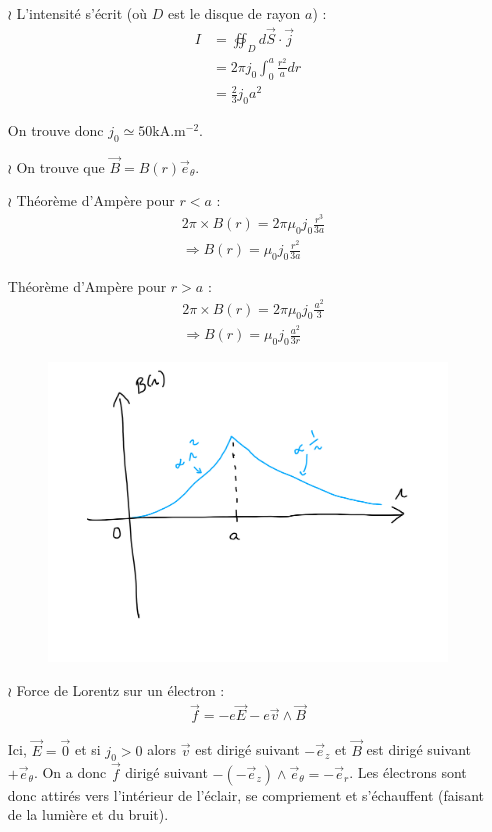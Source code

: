 \documentclass{report}
\begin{document}
\begin{itemize}

	\item[$\wr$] L'intensité s'écrit (où $D$ est le disque de rayon $a$) :
	\begin{align*}
		I &= \oiint_D d\vec{S}\cdot\vec{j} \\
		& = 2\pi j_0\int_0^a \frac{r^2}{a}dr \\
		& = \frac{2}{3}j_0a^2
	\end{align*}
	
	On trouve donc $j_0\simeq50$kA.m$^{-2}$.

	\item[$\wr$] On trouve que $\vec{B}=B(r)\vec{e}_\theta$.
	
	\item[$\wr$] Théorème d'Ampère pour $r<a$ :
	\begin{align*}
	 	& 2\pi\times B(r)=2\pi\mu_0j_0\frac{r^3}{3a} \\
	 	&\Rightarrow B(r) = \mu_0j_0\frac{r^2}{3a}
	\end{align*}
	
	Théorème d'Ampère pour $r>a$ :
	\begin{align*}
	 	& 2\pi\times B(r)=2\pi\mu_0j_0\frac{a^2}{3} \\
	 	&\Rightarrow B(r) = \mu_0j_0\frac{a^2}{3r}
	\end{align*}
	
	\begin{figure}[h!]
\centering
		\includegraphics[scale=0.3]{foudre.pdf}
\end{figure}
	
	\item[$\wr$] Force de Lorentz sur un électron : 
	\begin{align*}
		\vec{f} = -e\vec{E}-e\vec{v}\wedge\vec{B}
	\end{align*}
	
	Ici, $\vec{E}=\vec{0}$ et si $j_0>0$ alors $\vec{v}$ est dirigé suivant $-\vec{e}_z$ et $\vec{B}$ est dirigé suivant $+\vec{e}_\theta$.
	On a donc $\vec{f}$ dirigé suivant $-(-\vec{e}_z)\wedge\vec{e}_\theta=-\vec{e}_r$. Les électrons sont donc attirés vers l'intérieur de l'éclair, se compriement et s'échauffent (faisant de la lumière et du bruit).

\end{itemize}
\end{document}
